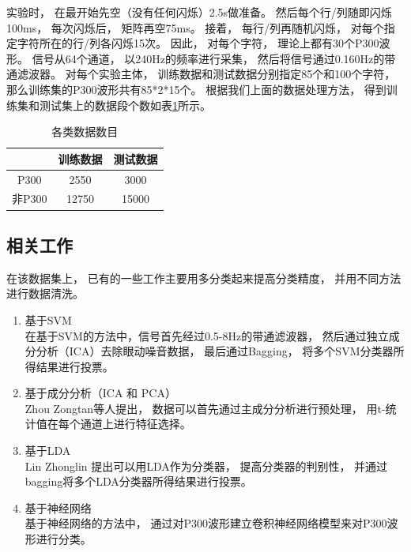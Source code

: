 实验时， 在最开始先空（没有任何闪烁）2.5s做准备。 然后每个行/列随即闪烁100ms， 每次闪烁后， 矩阵再空75ms。 接着， 每行/列再随机闪烁， 对每个指定字符所在的行/列各闪烁15次。 因此， 对每个字符， 理论上都有30个P300波形。 信号从64个通道， 以240Hz的频率进行采集， 然后将信号通过0.160Hz的带通滤波器\cite{sharbrough1991american}。 对每个实验主体， 训练数据和测试数据分别指定85个和100个字符， 那么训练集的P300波形共有85*2*15个。 根据我们上面的数据处理方法， 得到训练集和测试集上的数据段个数如表\ref{tab:p300_experiment_conf}所示。 


\begin{table}[ht]
\centering
  \begin{tabular}{|c||c|c|}
  \hline
   & 训练数据 & 测试数据\\
  \hline\hline
   P300 & 2550 & 3000\\
  \hline
  非P300 & 12750 & 15000\\
  \hline
  \end{tabular}
  \caption{各类数据数目}
  \centering \label{tab:p300_experiment_conf}
\end{table}


\subsection{相关工作}
在该数据集上， 已有的一些工作主要用多分类起来提高分类精度， 并用不同方法进行数据清洗。
\begin{enumerate}
	\item 基于SVM\cite{rakotomamonjy2008bci,blankertz2002classifying}\\
	在基于SVM的方法中，信号首先经过0.5-8Hz的带通滤波器， 然后通过独立成分分析（ICA）去除眼动噪音数据， 最后通过Bagging， 将多个SVM分类器所得结果进行投票。
	\item 基于成分分析（ICA 和 PCA）\\
	Zhou Zongtan等人提出， 数据可以首先通过主成分分析进行预处理， 用t-统计值在每个通道上进行特征选择。
	\item 基于LDA\cite{breiman1996bagging}\\
	Lin Zhonglin 提出可以用LDA作为分类器， 提高分类器的判别性， 并通过bagging将多个LDA分类器所得结果进行投票。
	\item 基于神经网络\cite{felzer2003analyzing,anderson1995determining,cecotti2008time,masic1995neural,masic1993neural}\\
	基于神经网络的方法中， 通过对P300波形建立卷积神经网络模型来对P300波形进行分类。
\end{enumerate}


